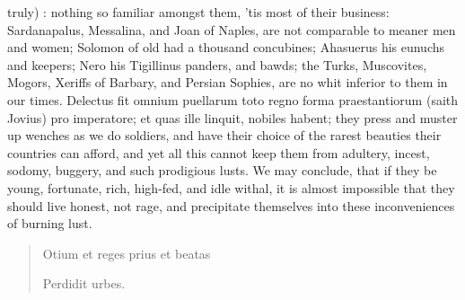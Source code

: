 truly) :
nothing so familiar amongst them, 'tis most of their business:
Sardanapalus, Messalina, and Joan of Naples, are not comparable to
meaner men and women; Solomon of old had a thousand concubines;
Ahasuerus his eunuchs and keepers; Nero his Tigillinus panders, and
bawds; the Turks,  Muscovites, Mogors, Xeriffs of Barbary, and
Persian Sophies, are no whit inferior to them in our times. Delectus
fit omnium puellarum toto regno forma praestantiorum (saith Jovius) pro
imperatore; et quas ille linquit, nobiles habent; they press and muster
up wenches as we do soldiers, and have their choice of the rarest
beauties their countries can afford, and yet all this cannot keep them
from adultery, incest, sodomy, buggery, and such prodigious lusts. We
may conclude, that if they be young, fortunate, rich, high-fed, and
idle withal, it is almost impossible that they should live honest, not
rage, and precipitate themselves into these inconveniences of burning
lust.

\begin{latin}
\begin{verse}%
Otium et reges prius et beatas

Perdidit urbes.
\end{verse}%
\end{latin}

